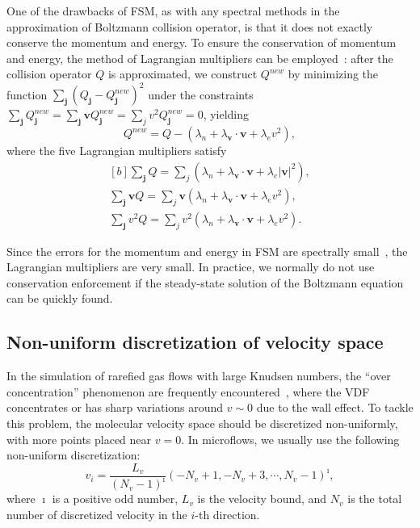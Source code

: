 One of the drawbacks of FSM, as with any spectral methods in the approximation of Boltzmann collision operator, is that it does not exactly conserve the momentum and energy. To ensure the conservation of momentum and energy, the method of Lagrangian multipliers can be employed~\cite{Gamba2009}: after the collision operator $Q$ is approximated, we construct $Q^{new}$ by minimizing the function $\sum_{\bm{j}}(Q_{\bm{j}}-Q_{\bm{j}}^{new})^2$ under the constraints $\sum_{\bm{j}} Q_{\bm{j}}^{new}=\sum_{\bm{j}} \bm{v}Q_{\bm{j}}^{new}=\sum_j {v^2}Q_{\bm{j}}^{new}=0$, yielding
\begin{equation*}\label{Lagrangian1}
{Q}^{new}={Q}-(\lambda_n+\lambda_{\bm{v}}\cdot{}\bm{v}+\lambda_e {v^2}),
\end{equation*}
where the five Lagrangian multipliers satisfy
\begin{equation*}
\begin{aligned}[b]
\sum_{\bm{j}} Q=\sum_j (\lambda_n+\lambda_{\bm{v}}\cdot{}\bm{v}+\lambda_e |\bm{\bm{v}}|^2), \\
\sum_{\bm{j}} \bm{v}Q=\sum_j \bm{v}(\lambda_n+\lambda_{\bm{v}}\cdot{}\bm{v}+\lambda_e {v^2}), \\
\sum_{\bm{j}} {v^2} Q=\sum_j {v^2}(\lambda_n+\lambda_{\bm{v}}\cdot{}\bm{v}+\lambda_e {v^2}).
\end{aligned}
\end{equation*}

Since the errors for the momentum and energy in FSM are spectrally small~\cite{Mouhot2006}, the Lagrangian multipliers are very small. In practice, we normally do not use  conservation enforcement if the steady-state solution of the Boltzmann equation can be quickly found.



\subsection{Non-uniform discretization of velocity space}

In the simulation of rarefied gas flows with large Knudsen numbers, the ``over concentration'' phenomenon are frequently encountered~\cite{Takata2011}, where the VDF concentrates or has sharp variations around $v\sim0$ due to the wall effect. To tackle this problem, the molecular velocity space should be discretized non-uniformly, with more points placed near $v=0$. In microflows, we usually use the following non-uniform discretization:
\begin{equation}\label{nonuniform_v}
v_i=\frac{L_v}{(N_v-1)^\imath}(-N_v+1,-N_v+3,\cdots,{N_v-1})^\imath,
\end{equation}
where $\imath$ is a positive odd number, $L_v$ is the velocity bound, and $N_v$ is the total number of discretized velocity in the $i$-th direction. 


